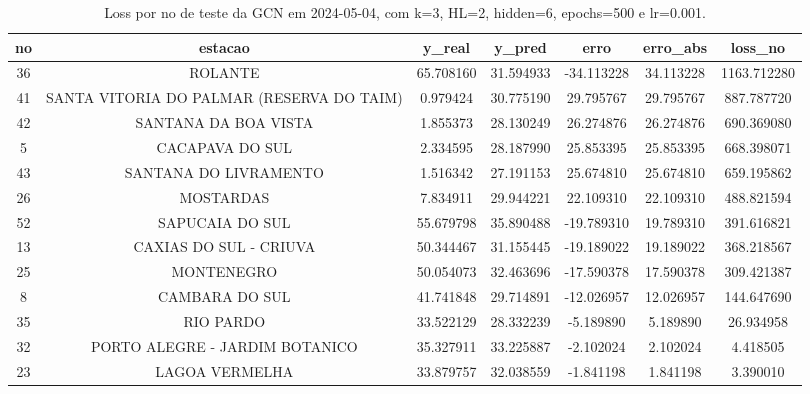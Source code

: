 \begin{table}[h]
\centering
\caption{Loss por no de teste da GCN em 2024-05-04, com k=3, HL=2, hidden=6, epochs=500 e lr=0.001.}
\label{tab:gcn_loss_k3_hl2_h6_e500_d20240504}
\begin{tabular}{ccccccc}
\toprule
no & estacao & y\_real & y\_pred & erro & erro\_abs & loss\_no \\
\midrule
36 & ROLANTE & 65.708160 & 31.594933 & -34.113228 & 34.113228 & 1163.712280 \\
41 & SANTA VITORIA DO PALMAR (RESERVA DO TAIM) & 0.979424 & 30.775190 & 29.795767 & 29.795767 & 887.787720 \\
42 & SANTANA DA BOA VISTA & 1.855373 & 28.130249 & 26.274876 & 26.274876 & 690.369080 \\
5 & CACAPAVA DO SUL & 2.334595 & 28.187990 & 25.853395 & 25.853395 & 668.398071 \\
43 & SANTANA DO LIVRAMENTO & 1.516342 & 27.191153 & 25.674810 & 25.674810 & 659.195862 \\
26 & MOSTARDAS & 7.834911 & 29.944221 & 22.109310 & 22.109310 & 488.821594 \\
52 & SAPUCAIA DO SUL & 55.679798 & 35.890488 & -19.789310 & 19.789310 & 391.616821 \\
13 & CAXIAS DO SUL - CRIUVA & 50.344467 & 31.155445 & -19.189022 & 19.189022 & 368.218567 \\
25 & MONTENEGRO & 50.054073 & 32.463696 & -17.590378 & 17.590378 & 309.421387 \\
8 & CAMBARA DO SUL & 41.741848 & 29.714891 & -12.026957 & 12.026957 & 144.647690 \\
35 & RIO PARDO & 33.522129 & 28.332239 & -5.189890 & 5.189890 & 26.934958 \\
32 & PORTO ALEGRE - JARDIM BOTANICO & 35.327911 & 33.225887 & -2.102024 & 2.102024 & 4.418505 \\
23 & LAGOA VERMELHA & 33.879757 & 32.038559 & -1.841198 & 1.841198 & 3.390010 \\
\bottomrule
\end{tabular}
\end{table}
